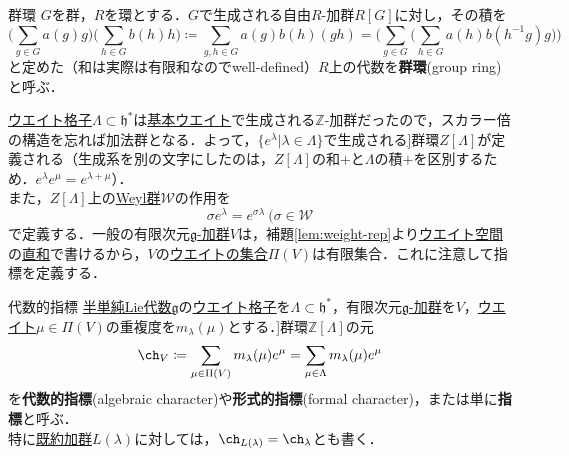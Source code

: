 \documentclass[rep_main]{subfiles}
\begin{document}
\begin{mydef}[label=def:group-ring]{群環}
	$G$を群，$R$を環とする．$G$で生成される自由$R$-加群$R[G]$に対し，その積を
	\begin{equation}
		\biggl(\sum_{g \in G} a(g)g \biggr)\biggl(\sum_{h \in G} b(h)h \biggr) \coloneqq \sum_{g, h \in G} a(g)b(h)(gh) = \biggl(\sum_{g \in G} \biggl(\sum_{h \in G} a(h)b(h^{-1}g)g \biggr) \biggr)
	\end{equation}
	と定めた（和は実際は有限和なのでwell-defined）$R$上の代数を\textbf{群環}(group ring)と呼ぶ．
\end{mydef}
\hyperref[def:root-lattice]{ウエイト格子}$\Lambda \subset \mathfrak{h}^*$は\hyperref[def:fundamental-weight]{基本ウエイト}で生成される$\mathbb{Z}$-加群だったので，スカラー倍の構造を忘れば加法群となる．よって，$\{e^\lambda | \lambda \in \Lambda\}$で生成される\hyperref[def:group-ring]]{群環}$Z[\Lambda]$が定義される（生成系を別の文字にしたのは，$Z[\Lambda]$の和$+$と$\Lambda$の積$+$を区別するため．$e^\lambda e^\mu = e^{\lambda + \mu}$）．\\
また，$Z[\Lambda]$上の\hyperref[def:Weylgroup]{Weyl群}$\mathscr{W}$の作用を
\begin{equation}
	\sigma e^\lambda = e^{\sigma\lambda}\ (\sigma \in \mathscr{W}
\end{equation}
で定義する．一般の有限次元\hyperref[ax:g-module]{$\mathfrak{g}$-加群}$V$は，補題\ref{lem:weight-rep}より\hyperref[def:weight-rep]{ウエイト空間}の\hyperref[def:univ-vec-sum]{直和}で書けるから，$V$の\hyperref[def:weight-rep]{ウエイトの集合}$\Pi(V)$は有限集合．これに注意して指標を定義する．
\begin{mydef}[label=def:alg-character]{代数的指標}
	\hyperref[def:semisimple-LieAlg]{半単純Lie代数}$\mathfrak{g}$の\hyperref[def:root-lattice]{ウエイト格子}を$\Lambda \subset \mathfrak{h}^*$，有限次元\hyperref[ax:g-module]{$\mathfrak{g}$-加群}を$V$，\hyperref[def:weight-rep]{ウエイト}$\mu \in \Pi(V)$の重複度を$m_\lambda(\mu)$とする．\hyperref[def:group-ring]]{群環}$\mathbb{Z}[\Lambda]$の元
	\begin{equation}
		\ch_V \coloneqq \sum_{\mu \in \Pi(V)} m_\lambda(\mu)e^\mu = \sum_{\mu \in \Lambda} m_\lambda(\mu)e^\mu
	\end{equation}
	を\textbf{代数的指標}(algebraic character)や\textbf{形式的指標}(formal character)，または単に\textbf{指標}と呼ぶ．\\
	特に\hyperref[thm:hwmodule-exist]{既約加群}$L(\lambda)$に対しては，$\ch_{L(\lambda)} = \ch_\lambda$とも書く．
\end{mydef}
\end{document}
